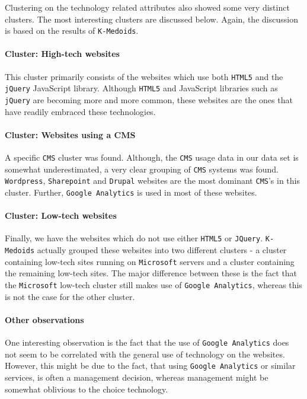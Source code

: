 Clustering on the technology related attributes also showed some very distinct clusters. The most interesting clusters are discussed below. Again, the discussion is based on the results of \texttt{K-Medoids}.

\paragraph{Cluster: High-tech websites}

This cluster primarily consists of the websites which use both \texttt{HTML5} and the \texttt{jQuery} JavaScript library. Although \texttt{HTML5} and JavaScript libraries such as \texttt{jQuery} are becoming more and more common, these websites are the ones that have readily embraced these technologies.

\paragraph{Cluster: Websites using a CMS}

A specific \texttt{CMS} cluster was found. Although, the \texttt{CMS} usage data in our data set is somewhat underestimated, a very clear grouping of \texttt{CMS} systems was found. \texttt{Wordpress}, \texttt{Sharepoint} and \texttt{Drupal} websites are the most dominant \texttt{CMS}'s in this cluster. Further, \texttt{Google Analytics} is used in most of these websites.

\paragraph{Cluster: Low-tech websites}

Finally, we have the websites which do not use either \texttt{HTML5} or \texttt{JQuery}. \texttt{K-Medoids} actually grouped these websites into two different clusters - a cluster containing low-tech sites running on \texttt{Microsoft} servers and a cluster containing the remaining low-tech sites. The major difference between these is the fact that the \texttt{Microsoft} low-tech cluster still makes use of \texttt{Google Analytics}, whereas this is not the case for the other cluster.

\paragraph{Other observations}

One interesting observation is the fact that the use of \texttt{Google Analytics} does not seem to be correlated with the general use of technology on the websites. However, this might be due to the fact, that using \texttt{Google Analytics} or similar services, is often a management decision, whereas management might be somewhat oblivious to the choice technology.


